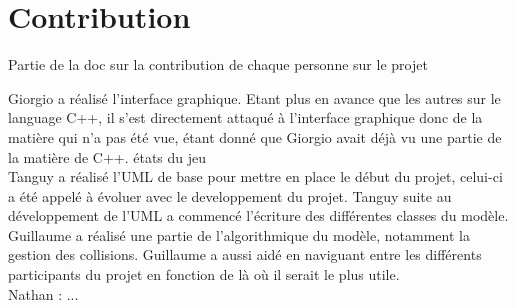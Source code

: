 \section{Contribution}
Partie de la doc sur la contribution de chaque personne sur le projet

Giorgio a réalisé l'interface graphique. Etant plus en avance que les autres sur le language C++, il s'est directement attaqué à l'interface graphique donc de la matière qui n'a pas été vue, étant donné que Giorgio avait déjà vu une partie de la matière de C++. états du jeu
\\

Tanguy a réalisé  l'UML de base pour mettre en place le début du projet, celui-ci a été appelé à évoluer avec le developpement du projet. Tanguy suite au développement de l'UML a commencé l'écriture des différentes classes du modèle.\\

Guillaume a réalisé une partie de l'algorithmique du modèle, notamment la gestion des collisions. Guillaume a aussi aidé en naviguant entre les différents participants du projet en fonction de là où il serait le plus utile.\\

Nathan : ...
